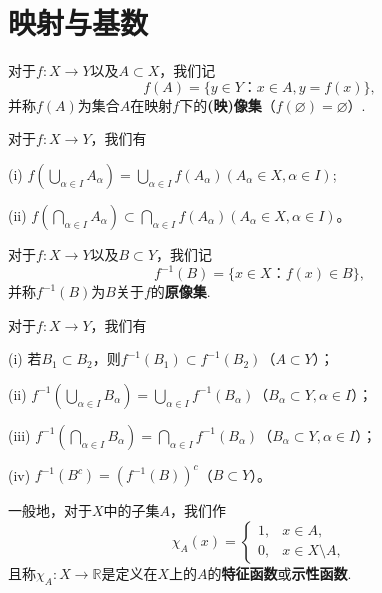 \documentclass[../../main.tex]{subfiles}
\begin{document}
\section{映射与基数}

\begin{definition}[映射的像集]\label{definition:映射的像集}
  对于\(f:X\rightarrow Y\)以及\(A\subset X\)，我们记
\[f(A)=\{y\in Y：x\in A,y = f(x)\},\]
并称\(f(A)\)为集合\(A\)在映射\(f\)下的\textbf{(映)像集}（\(f(\varnothing)=\varnothing\)）.
\end{definition}

\begin{proposition}[映射的像集的基本性质]\label{proposition:映射的像集的基本性质}
  对于\(f:X\rightarrow Y\)，我们有

  (i) \(f\left(\bigcup_{\alpha\in I}A_{\alpha}\right)=\bigcup_{\alpha\in I}f(A_{\alpha})\left( A_{\alpha}\in X,\alpha \in I \right) \);

(ii) \(f\left(\bigcap_{\alpha\in I}A_{\alpha}\right)\subset\bigcap_{\alpha\in I}f(A_{\alpha})\left( A_{\alpha}\in X,\alpha \in I \right) \)。
\end{proposition}

\begin{definition}[映射的原像集]\label{definition:映射的原像集}
  对于\(f:X\rightarrow Y\)以及\(B\subset Y\)，我们记
\[f^{-1}(B)=\{x\in X：f(x)\in B\},\]
并称\(f^{-1}(B)\)为\(B\)关于\(f\)的\textbf{原像集}.
\end{definition}

\begin{proposition}[映射的原像集的基本性质]\label{proposition:映射的原像集的基本性质}
  对于\(f:X\rightarrow Y\)，我们有

  (i) 若\(B_1\subset B_2\)，则\(f^{-1}(B_1)\subset f^{-1}(B_2)\)（\(A\subset Y\)）；

(ii) \(f^{-1}\left(\bigcup_{\alpha\in I}B_{\alpha}\right)=\bigcup_{\alpha\in I}f^{-1}(B_{\alpha})\)（\(B_{\alpha}\subset Y,\alpha\in I\)）；

(iii) \(f^{-1}\left(\bigcap_{\alpha\in I}B_{\alpha}\right)=\bigcap_{\alpha\in I}f^{-1}(B_{\alpha})\)（\(B_{\alpha}\subset Y,\alpha\in I\)）；

(iv) \(f^{-1}(B^c)=(f^{-1}(B))^c\)（\(B\subset Y\)）。
\end{proposition}

\begin{definition}[示性函数]\label{definition:示性函数}
  一般地，对于\(X\)中的子集\(A\)，我们作
\[
\chi_A(x)=
\begin{cases}
1, & x\in A, \\
0, & x\in X\setminus A,
\end{cases}
\]
且称\(\chi_A:X\rightarrow\mathbb{R}\)是定义在\(X\)上的\(A\)的\textbf{特征函数}或\textbf{示性函数}.
\end{definition}
\end{document}
